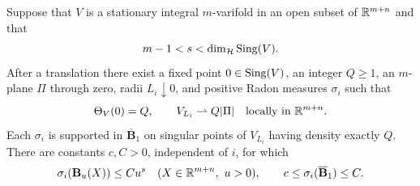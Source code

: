 \begin{proposition}
\label{prop:flat-scales}
Suppose that $V$ is a stationary integral $m$-varifold in an open
subset of $\mathbb R^{m+n}$ and that
\[
 m-1<s<\dim_{\mathcal H}\operatorname{Sing}(V).
\]
After a translation there exist a fixed point $0\in\operatorname{Sing}(V)$, an
integer $Q\ge1$, an $m$-plane $\Pi$ through zero, radii $L_i\downarrow0$,
and positive Radon measures $\sigma_i$ such that
\begin{equation}
 \label{eq:flat-targets}
 \Theta_V(0)=Q,\qquad V_{L_i}\rightharpoonup Q|\Pi|
 \quad\hbox{locally in }\mathbb R^{m+n}.
\end{equation}
Each $\sigma_i$ is supported in $\overline{\mathbf B}_1$ on singular
points of $V_{L_i}$ having density exactly $Q$. There are constants
$c,C>0$, independent of $i$, for which
\begin{equation}
 \label{eq:center-measure-bounds}
 \sigma_i(\mathbf B_u(X))\le C u^s
 \quad(X\in\mathbb R^{m+n},\ u>0),\qquad
 c\le\sigma_i(\overline{\mathbf B}_1)\le C.
\end{equation}
\end{proposition}

